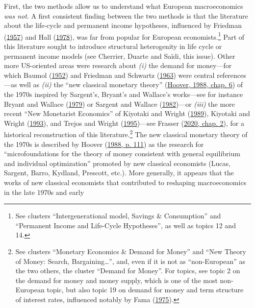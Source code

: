 \documentclass[
]{article}
\begin{document}
First, the two methods allow us to understand what European
macroeconomics \emph{was not}. A first consistent finding between the
two methods is that the literature about the life-cycle and permanent
income hypotheses, influenced by Friedman
(\protect\hyperlink{ref-friedman1957}{1957}) and Hall
(\protect\hyperlink{ref-hall1978b}{1978}), was far from popular for
European economists.\footnote{See clusters ``Intergenerational model,
  Savings \& Consumption'' and ``Permanent Income and Life-Cycle
  Hypotheses'', as well as topics 12 and 14.} Part of this literature
sought to introduce structural heterogenity in life cycle or permanent
income models (see Cherrier, Duarte and Saïdi, this issue). Other more
US-oriented areas were research about \emph{(i)} the demand for
money---for which Baumol (\protect\hyperlink{ref-baumol1952}{1952}) and
Friedman and Schwartz (\protect\hyperlink{ref-friedman1963}{1963}) were
central references---as well as \emph{(ii)} the ``new classical monetary
theory'' (\protect\hyperlink{ref-hoover1988}{Hoover, 1988, chap. 6}) of
the 1970s inspired by Sargent's, Bryant's and Wallace's works---see for
instance Bryant and Wallace (\protect\hyperlink{ref-bryant1979}{1979})
or Sargent and Wallace (\protect\hyperlink{ref-sargent1982}{1982})---or
\emph{(iii)} the more recent ``New Monetarist Economics'' of Kiyotaki
and Wright (\protect\hyperlink{ref-kiyotaki1989}{1989}), Kiyotaki and
Wright (\protect\hyperlink{ref-kiyotaki1993}{1993}), and Trejos and
Wright (\protect\hyperlink{ref-trejos1995}{1995})---see Frasser
(\protect\hyperlink{ref-frasser2020}{2020, chap. 2}), for a historical
reconstruction of this literature.\footnote{See clusters ``Monetary
  Economics \& Demand for Money'' and ``New Theory of Money: Search,
  Bargaining\ldots{}'', and, even if it is not as ``non-European'' as
  the two others, the cluster ``Demand for Money''. For topics, see
  topic 2 on the demand for money and money supply, which is one of the
  most non-European topic, but also topic 19 on demand for money and
  term structure of interest rates, influenced notably by Fama
  (\protect\hyperlink{ref-fama1975}{1975}).} The new classical monetary
theory of the 1970s is described by Hoover
(\protect\hyperlink{ref-hoover1988}{1988, p. 111}) as the research for
``microfoundations for the theory of money consistent with general
equilibrium and individual optimization'' promoted by new classical
economists (Lucas, Sargent, Barro, Kydland, Prescott, etc.). More
generally, it appears that the works of new classical economists that
contributed to reshaping macroeconomics in the late 1970s and early
\end{document}

